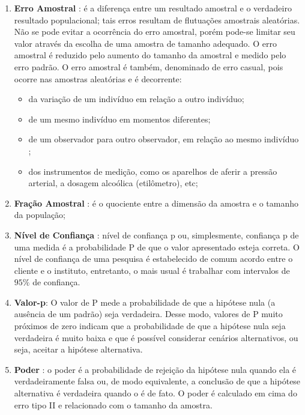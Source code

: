 \begin{enumerate}
\item \textbf{Erro Amostral} : é a diferença entre um resultado amostral e o verdadeiro resultado populacional; tais erros resultam de flu\-tu\-a\-ções amos\-trais aleatórias. Não se pode evitar a ocorrência do erro amostral, porém pode-se limitar seu valor através da escolha de uma amostra de tamanho adequado. O erro amostral é reduzido pelo aumento do tamanho da amostral e medido pelo erro padrão. O erro amostral é também, denominado de erro casual, pois ocorre nas amostras aleatórias e é decorrente:

\begin{itemize}
\item da variação de um indivíduo em relação a outro indivíduo;
\item de um mesmo indivíduo em momentos diferentes;
\item de um observador para outro observador, em relação ao mesmo indivíduo ;
\item dos instrumentos de medição, como os aparelhos de aferir a pressão arterial, a dosagem alcoólica (etilômetro), etc;
\end{itemize}

\item \textbf{Fração Amostral} : é o quociente entre a dimensão da amostra e o tamanho da população; 
\item \textbf{Nível de Confiança} : nível de confiança p ou, simplesmente, confiança p de uma medida é a probabilidade P de que o valor apresentado esteja correta. O nível de confiança de uma pesquisa é estabelecido de comum acordo entre o cliente e o instituto, entretanto, o mais usual é trabalhar com intervalos de $95\%$ de confiança.

\item \textbf{Valor-p}: O valor de P mede a probabilidade de que a hipótese nula (a ausência de um padrão) seja verdadeira. Desse modo, valores de P muito próximos de zero indicam que a probabilidade de que a hipótese nula seja verdadeira é muito baixa e que é possível considerar cenários alternativos, ou seja, aceitar a hipótese alternativa.
\item \textbf{Poder} : o poder é a probabilidade de rejeição da hipótese nula quando ela é verdadeiramente falsa ou, de modo equivalente, a conclusão de que a hipótese alternativa é verdadeira quando o é de fato. O poder é calculado em cima do erro tipo II e relacionado com o tamanho da amostra.
\end{enumerate}

